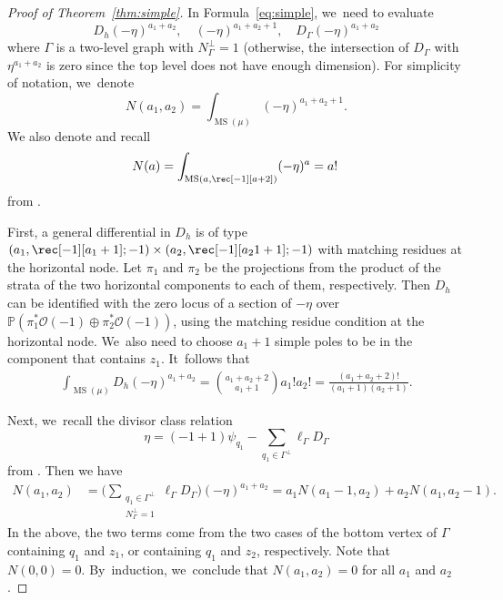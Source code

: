 \documentclass[JEP,XML,SOM,Unicode,NoFloatCountersInSection,published]{cedram}
\newcommand\PP{{\mathbb P}}
\newcommand{\mO}{\mathcal{O}}
\DeclareMathOperator\MS{MS}
\theoremstyle{definition}
\begin{document}
\begin{proof}[Proof of Theorem~\ref{thm:simple}]
In Formula~\eqref{eq:simple}, we~need to evaluate
\[
D_h (-\eta)^{a_1+a_2}, \quad (-\eta)^{a_1+a_2+1},\quad D_\Gamma (-\eta)^{a_1+a_2}
\]
where $\Gamma$ is a two-level graph with $N_\Gamma^{\bot} = 1$ (otherwise, the intersection of $D_\Gamma$ with $\eta^{a_1+a_2}$ is zero since the top level does not have enough dimension). For simplicity of notation, we~denote
\[
N(a_1, a_2) = \int_{\MS(\mu)} (-\eta)^{a_1+a_2+1}.
\]
We also denote and recall
\[
N(a) = \int_{\MS(a, \rec[-1][a+2])} (-\eta)^{a} = a! \,
\]
from \cite{ChPrIso}.

First, a general differential in $D_h$ is of type $(a_1,\rec[-1][a_1+1]; -1)\times (a_2, \rec[-1][a_21+1]; -1)$ with matching residues at the horizontal node. Let $\pi_1$ and $\pi_2$ be the projections from the product of the strata of the two horizontal components to each of them, respectively. Then $D_h$ can be identified with the zero locus of a section of $-\eta$ over $\PP(\pi_1^{*}\mO(-1) \oplus \pi_2^{*}\mO(-1))$, using the matching residue condition at the horizontal node. We~also need to choose $a_1+1$ simple poles to be in the component that contains $z_1$. It~follows that
\begin{align*}
\int_{\MS(\mu)}D_h (-\eta)^{a_1+a_2} = \binom{a_1 + a_2 + 2 }{a_1 + 1} a_1 ! a_2 !  = \frac{(a_1+a_2+2)!}{(a_1+1)(a_2+1)}.
\end{align*}

Next, we~recall the divisor class relation
\[
\eta = (-1+1) \psi_{q_1} -\sum_{q_1\in \Gamma^\bot} \ell_\Gamma D_\Gamma
\]
from \cite[Prop.\,8.2]{CMZ}.
Then we have
\begin{align*}
N (a_1, a_2) & = \biggl( \sum_{\substack{q_1\in \Gamma^\bot\\ N_\Gamma^{\bot} = 1}} \ell_\Gamma D_\Gamma \biggr) (-\eta)^{a_1+a_2} = a_1 N(a_1-1, a_2) + a_2 N(a_1, a_2-1).
\end{align*}
In the above, the two terms come from the two cases of the bottom vertex of $\Gamma$ containing $q_1$ and $z_1$, or containing $q_1$ and $z_2$, respectively. Note that $N(0,0) = 0$. By~induction, we~conclude that $N(a_1, a_2) = 0$ for all $a_1$ and $a_2$.


\end{proof}
\end{document}
